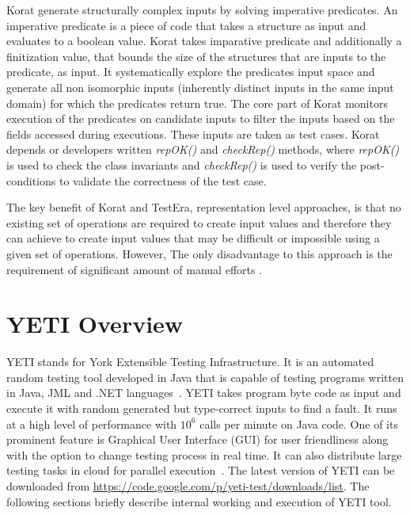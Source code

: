 Korat generate structurally complex inputs by solving imperative predicates. An imperative predicate is a piece of code that takes a structure as input and evaluates to a boolean value. Korat takes imparative predicate and additionally a finitization value, that bounds the size of the structures that are inputs to the predicate, as input. It systematically explore the predicates input space and generate all non isomorphic inputs (inherently distinct inputs in the same input domain) for which the predicates return true. The core part of Korat monitors execution of the predicates on candidate inputs to filter the inputs based on the fields accessed during executions. These inputs are taken as test cases. Korat depends or developers written {\it repOK()} and {\it checkRep()} methods, where {\it repOK()} is used to check the class invariants and {\it checkRep()} is used to verify the post-conditions to validate the correctness of the test case. 

The key benefit of Korat and TestEra, representation level approaches, is that no existing set of operations are required to create input values and therefore they can achieve to create input values that may be difficult or impossible using a given set of operations. However, The only disadvantage to this approach is the requirement of significant amount of manual efforts \cite{pacheco2009directed}.    


\newpage

\section{YETI Overview}
YETI stands for York Extensible Testing Infrastructure. It is an automated random testing tool developed in Java that is capable of testing programs written in Java, JML and .NET languages~\cite{Oriol2010c}. YETI takes program byte code as input and execute it with random generated but type-correct inputs to find a fault. It runs at a high level of performance with $10^6$ calls per minute on Java code. One of its prominent feature is Graphical User Interface (GUI) for user friendliness along with the option to change testing process in real time. It can also distribute large testing tasks in cloud for parallel execution~\cite{Oriol2010}. The latest version of YETI can be downloaded from \url{https://code.google.com/p/yeti-test/downloads/list}. The following sections briefly describe internal working and execution of YETI tool. 

